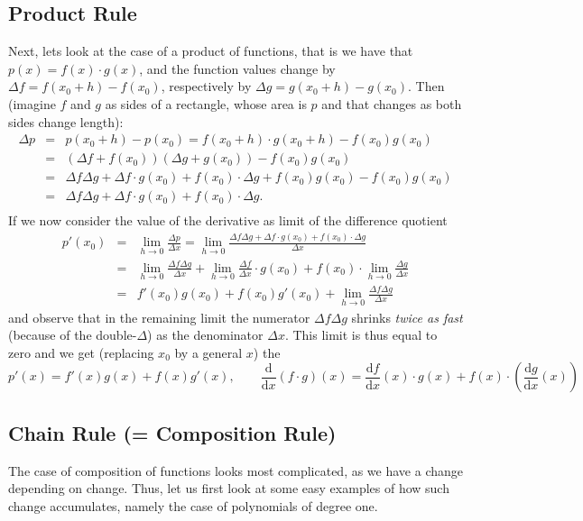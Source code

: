 \subsection{Product Rule}
Next, lets look at the case of a product of functions, that is we have that
$p(x)=f(x)\cdot g(x)$, and the function values change by $\Delta
f=f(x_0+h)-f(x_0)$,
respectively by $\Delta g=g(x_0+h)-g(x_0)$. Then (imagine $f$ and $g$ as
sides of a rectangle, whose area is $p$ and that changes as both sides
change length):
\begin{eqnarray*}
\Delta p&=&p(x_0+h)-p(x_0)=f(x_0+h)\cdot g(x_0+h)-f(x_0)g(x_0)\\
&=&\left(\Delta f+f(x_0)\right)\left(\Delta g+g(x_0)\right)-f(x_0)g(x_0)\\
&=&\Delta f\Delta g+\Delta f\cdot g(x_0)+f(x_0)\cdot \Delta g+f(x_0)g(x_0)-f(x_0)g(x_0)\\
&=&\Delta f\Delta g+\Delta f\cdot g(x_0)+f(x_0)\cdot \Delta g.\\
\end{eqnarray*}
If we now consider the value of the derivative as limit of the difference
quotient
\begin{eqnarray*}
p'(x_0)&=&\lim_{h\to 0}\frac{\Delta p}{\Delta x}
=\lim_{h\to 0}\frac{\Delta f\Delta g+\Delta f\cdot g(x_0)+f(x_0)\cdot
\Delta g}{\Delta x}\\
&=&\lim_{h\to 0}\frac{\Delta f\Delta g}{\Delta x}+\lim_{h\to 0}\frac{\Delta
f}{\Delta x}\cdot g(x_0)+f(x_0)\cdot\lim_{h\to 0}\frac{\Delta g}{\Delta x}\\
&=&f'(x_0)g(x_0)+f(x_0)g'(x_0)+\lim_{h\to 0}\frac{\Delta f\Delta g}{\Delta x}
\end{eqnarray*}
and observe that in the remaining limit the numerator $\Delta f\Delta g$
shrinks {\em twice as fast} (because of the double-$\Delta$) as the
denominator $\Delta x$. This limit is thus equal to zero and we get
(replacing $x_0$ by a general $x$) the 
\[
p'(x)=f'(x)g(x)+f(x)g'(x),
\qquad \frac{\mbox{d}}{\mbox{d}x} (f\cdot
g)(x)=\frac{\mbox{d}f}{\mbox{d}x}(x)\cdot
g(x)+f(x)\cdot\left(\frac{\mbox{d}g}{\mbox{d}x}(x)\right)
\]

\subsection{Chain Rule (= Composition Rule)}
The case of composition of functions looks most complicated, as we have a
change depending on change.
Thus, let us first look at some easy examples of how such change
accumulates, namely the case of polynomials of degree one.

